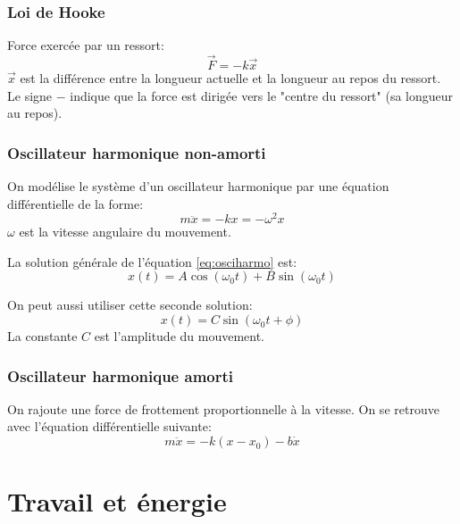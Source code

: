 \documentclass{article}
\numberwithin{equation}{section}
\begin{document}
\subsubsection{Loi de Hooke}
Force exercée par un ressort:
\begin{equation}
	\boxed{\vec F = - k \vec x}
\end{equation}
\(\vec x\) est la différence entre la longueur actuelle et la longueur au repos du ressort. Le signe \(-\) indique que la force est dirigée vers le "centre du ressort" (sa longueur au repos).

\subsubsection{Oscillateur harmonique non-amorti}
On modélise le système d'un oscillateur harmonique par une équation différentielle de la forme:
\begin{equation} \label{eq:osciharmo}
	\boxed{ m \ddot x = - kx = - \omega^2 x }
\end{equation}
\(\omega\) est la vitesse angulaire du mouvement.

La solution générale de l'équation \ref{eq:osciharmo} est:
\begin{equation}
	\boxed{ x(t) = A \cos(\omega_0 t) + B \sin(\omega_0 t) }
\end{equation}

On peut aussi utiliser cette seconde solution:
\begin{equation}
	\boxed{ x(t) = C \sin(\omega_0 t + \phi) }
\end{equation}
La constante \(C\) est l'amplitude du mouvement.

\subsubsection{Oscillateur harmonique amorti}
On rajoute une force de frottement proportionnelle à la vitesse. On se retrouve avec l'équation différentielle suivante:
\begin{equation}
	\boxed{ m \ddot x = - k(x - x_0) - b \dot x }
\end{equation}



\section{Travail et énergie}
\end{document}
